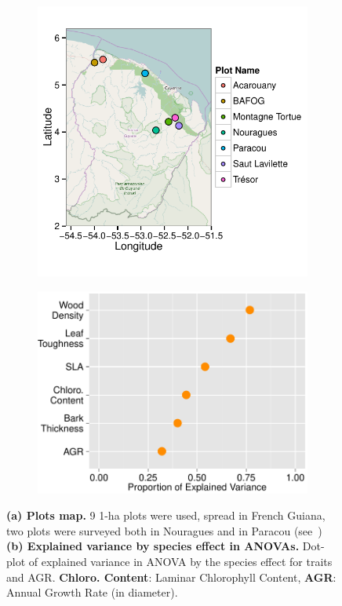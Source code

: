 \begin{figure}[!tb]
	\centering
	\begin{subfigure}[c]{0.45\textwidth}
		\includegraphics[scale=0.75]{figures/Plots_Map_2015-05-26.pdf}
		\caption{}
		\label{fig:map}
	\end{subfigure}
	\begin{subfigure}[c]{0.5\textwidth}
		\includegraphics[scale=0.7]{figures/Aov_Var_Traits_2015-05-25.pdf}
		\caption{}
		\label{fig:aov}
	\end{subfigure}
	\caption{\textbf{(a) Plots map.} 9 1-ha plots were used, spread in French Guiana, two plots were surveyed both in Nouragues and in Paracou (see~\citealp{baraloto_decoupled_2010}) \textbf{(b) Explained variance by species effect in ANOVAs.} Dot-plot of explained variance in ANOVA by the species effect for traits and AGR. \textbf{Chloro. Content}: Laminar Chlorophyll Content, \textbf{AGR}: Annual Growth Rate (in diameter).}
	\label{fig:gen}
\end{figure}

